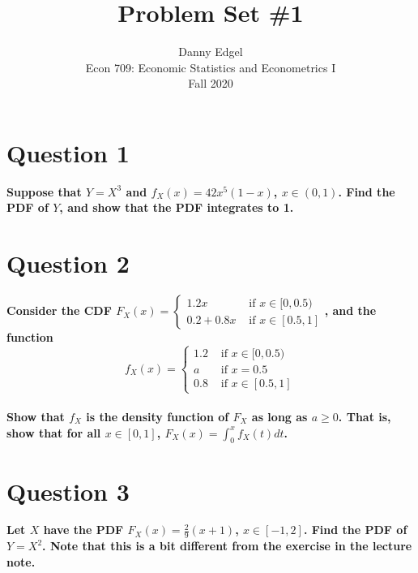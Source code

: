 \documentclass{article}
\begin{document}
\title{	Problem Set \#1 }
\author{ 	Danny Edgel 										\\ 
			Econ 709: Economic Statistics and Econometrics I	\\
			Fall 2020											\\
		}
\maketitle\thispagestyle{empty}


\section*{Question 1}
\textbf{Suppose that $Y=X^3$ and $f_X(x)=42x^5(1-x)$, $x\in(0,1)$. Find the PDF of $Y$, and show that the PDF integrates to 1.}
\bigskip \\



\section*{Question 2}
\textbf{Consider the CDF $F_X(x)=\begin{cases}1.2x&\text{   if } x\in[0,0.5) \\ 0.2+0.8x&\text{   if } x\in[0.5,1] \end{cases}$, and the function}
\[
	f_X(x)=\begin{cases}1.2&\text{   if } x\in[0,0.5) \\ a&\text{   if } x=0.5 \\ 0.8&\text{   if } x\in[0.5,1]\end{cases}
\]
\smallskip \\
\textbf{Show that $f_X$ is the density function of $F_X$ as long as $a\geq0$. That is, show that for all $x\in[0,1]$, $F_X(x)=\int_0^x f_X(t)dt$.}
\bigskip \\




\section*{Question 3}
\textbf{Let $X$ have the PDF $F_X(x)=\frac{2}{9}(x+1)$, $x\in[-1,2]$. Find the PDF of $Y=X^2$. Note that this is a bit different from the exercise in the lecture note.}
\bigskip \\
\end{document}
